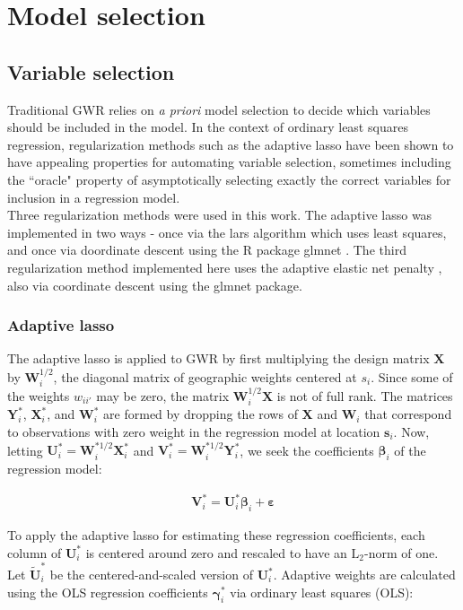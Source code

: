 \documentclass[authoryear, review, 11pt]{elsarticle}
\begin{document}
	
	 
	
\section{Model selection \label{section:model-selection}}
	\subsection{Variable selection}	
	Traditional GWR relies on \emph{a priori} model selection to decide which variables should be included in the model. In the context of ordinary least squares regression, regularization methods such as the adaptive lasso \citep{Zou:2006} have been shown to have appealing properties for automating variable selection, sometimes including the ``oracle" property of asymptotically selecting exactly the correct variables for inclusion in a regression model.\\
	
	Three regularization methods were used in this work. The adaptive lasso was implemented in two ways - once via the lars algorithm \citep{Efron:2004b} which uses least squares, and once via doordinate descent using the R package glmnet \citep{Friedman:2010}. The third regularization method implemented here uses the adaptive elastic net penalty \citep{Zou:2009}, also via coordinate descent using the glmnet package.
	
	\subsubsection{Adaptive lasso}
	The adaptive lasso is applied to GWR by first multiplying the design matrix $\bm{X}$ by $\bm{W}_i^{1/2}$, the diagonal matrix of geographic weights centered at $s_i$. Since some of the weights $w_{ii'}$ may be zero, the matrix $\bm{W}_i^{1/2}\bm{X}$ is not of full rank. The matrices $\bm{Y}_i^*$, $\bm{X}_i^*$, and $\bm{W}_i^*$ are formed by dropping the rows of $\bm{X}$  and $\bm{W}_i$ that correspond to observations with zero weight in the regression model at location $\bm{s}_i$. Now, letting $\bm{U}_i^* = \bm{W}_i^{*1/2} \bm{X}_i^*$ and $\bm{V}_i^* = \bm{W}_i^{*1/2} \bm{Y}_i^*$, we seek the coefficients $\bm{\beta}_i$ of the regression model:
	
	\begin{eqnarray}
		\bm{V}_i^* = \bm{U}_i^* \bm{\beta}_i + \bm{\varepsilon}
	\end{eqnarray}
	
	To apply the adaptive lasso for estimating these regression coefficients, each column of $\bm{U}_i^*$ is centered around zero and rescaled to have an $\mbox{L}_2$-norm of one. Let $\widetilde{\bm{U}}_i^*$ be the centered-and-scaled version of $\bm{U}_i^*$. Adaptive weights are calculated using the OLS regression coefficients $\bm{\gamma}_i^*$ via ordinary least squares (OLS):
	
\end{document}
